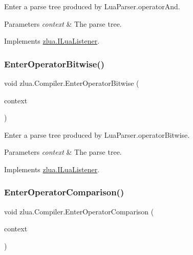 Enter a parse tree produced by Lua\+Parser.\+operator\+And. 


\begin{DoxyParams}{Parameters}
{\em context} & The parse tree.\\
\hline
\end{DoxyParams}


Implements \mbox{\hyperlink{interfacezlua_1_1_i_lua_listener_aa0c0270aabb19cc89bce3c5823a2f012}{zlua.\+I\+Lua\+Listener}}.

\mbox{\label{classzlua_1_1_compiler_a13c55dd9aa0ccdf16a6855282091f63f}} 
\subsubsection{\texorpdfstring{Enter\+Operator\+Bitwise()}{EnterOperatorBitwise()}}
{\footnotesize\ttfamily void zlua.\+Compiler.\+Enter\+Operator\+Bitwise (\begin{DoxyParamCaption}\item[{\mbox{[}\+Not\+Null\mbox{]} \mbox{\hyperlink{classzlua_1_1_lua_parser_1_1_operator_bitwise_context}{Lua\+Parser.\+Operator\+Bitwise\+Context}}}]{context }\end{DoxyParamCaption})}



Enter a parse tree produced by Lua\+Parser.\+operator\+Bitwise. 


\begin{DoxyParams}{Parameters}
{\em context} & The parse tree.\\
\hline
\end{DoxyParams}


Implements \mbox{\hyperlink{interfacezlua_1_1_i_lua_listener_a0117059ce449d21ba61dc80748edaa15}{zlua.\+I\+Lua\+Listener}}.

\mbox{\label{classzlua_1_1_compiler_ac4a8baa233d08987d8f276972567c343}} 
\subsubsection{\texorpdfstring{Enter\+Operator\+Comparison()}{EnterOperatorComparison()}}
{\footnotesize\ttfamily void zlua.\+Compiler.\+Enter\+Operator\+Comparison (\begin{DoxyParamCaption}\item[{\mbox{[}\+Not\+Null\mbox{]} \mbox{\hyperlink{classzlua_1_1_lua_parser_1_1_operator_comparison_context}{Lua\+Parser.\+Operator\+Comparison\+Context}}}]{context }\end{DoxyParamCaption})}



